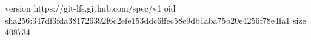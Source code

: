 version https://git-lfs.github.com/spec/v1
oid sha256:347df3fda381726392f6c2efe153ddc6ffec58e9db1aba75b20e4256f78e4fa1
size 408734
